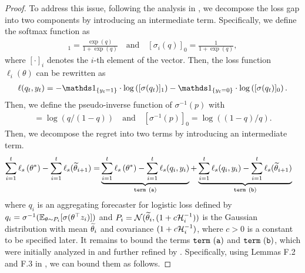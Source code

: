 \begin{proof}
    To address this issue, following the analysis in \citet{NeurIPS'23:MLogB}, we decompose the loss gap into two components by introducing an intermediate term. Specifically, we define the softmax function as 
    \begin{align*}
        [\sigma_i(q)]_1 = \frac{\exp(q)}{1+\exp(q)} \quad \text{and} \quad [\sigma_i(q)]_0 = \frac{1}{1+\exp(q)},
    \end{align*}
    where $[\cdot]_i$ denotes the $i$-th element of the vector. Then, the loss function $\ell_{i}(\theta)$ can be rewritten as
    \begin{align*}
        \ell(q_t, y_t) = -\ind{y_t = 1} \cdot \log \left({[\sigma(q_t)]_1}\right) -\ind{y_t = 0} \cdot \log \left({[\sigma(q_t)]_0}\right).
    \end{align*}
    Then, we define the pseudo-inverse function of $\sigma^{-1}(p)$ with 
    \begin{align*}
        [\sigma^{-1}(p)] = \log({q}/({1-q})) \quad \text{and} \quad [\sigma^{-1}(p)]_0 = \log((1-q)/{q}).
    \end{align*}
     Then, we decompose the regret into two terms by introducing an intermediate term.
    \begin{align*}
        \sum_{i=1}^t \ell_{s}\left(\theta^*\right)-\sum_{i=1}^t \ell_{s}(\widetilde{\theta}_{i+1}) = & \underbrace{\sum_{i=1}^t \ell_{s}\left(\theta^*\right)-\sum_{i=1}^t \ell_{s}(q_i, y_i)}_{\mathtt{term~(a)}} + \underbrace{\sum_{i=1}^t \ell_{s}(q_i, y_i) - \sum_{i=1}^t \ell_{s}(\widetilde{\theta}_{i+1})}_{\mathtt{term~(b)}}
    \end{align*}
    where $q_i$ is an aggregating forecaster for logistic loss defined by $q_i = \sigma^{-1}(\mathbb{E}_{\theta \sim P_i}[\sigma(\theta^\top z_i)])$ and $P_i=\mathcal{N}(\widetilde{\theta}_i, (1+c\mathcal{H}_i^{-1}))$  is the Gaussian distribution with mean $\widetilde{\theta}_i$ and covariance $(1+c\mathcal{H}_i^{-1})$, where $c>0$ is a constant to be specified later. It remains to bound the terms $\mathtt{term~(a)}$ and $\mathtt{term~(b)}$, which were initially analyzed in \citet{NeurIPS'23:MLogB} and further refined by \citet{NeurIPS'24:Lee-Optimal-MNL}. Specifically, using Lemmas F.2 and F.3 in \citet{NeurIPS'24:Lee-Optimal-MNL}, we can bound them as follows.


\end{proof}
